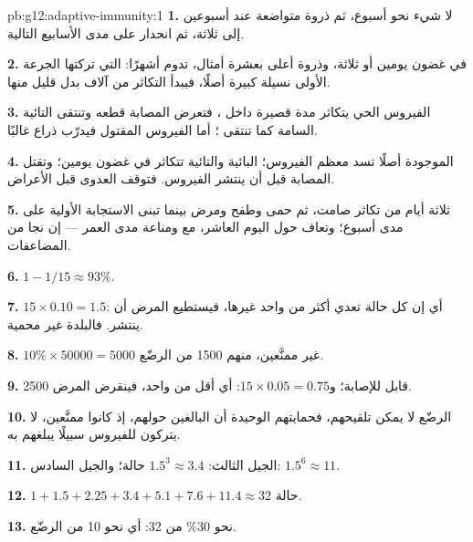 \begin{solution}{pb:g12:adaptive-immunity:1}
\textbf{1.} لا شيء نحو أسبوع، ثم ذروة متواضعة عند أسبوعين إلى ثلاثة،
ثم انحدار على مدى الأسابيع التالية.

\textbf{2.}  في غضون يومين أو ثلاثة، وذروة أعلى بعشرة
أمثال، تدوم أشهرًا:  التي تركتها الجرعة الأولى نسيلة
كبيرة أصلًا، فيبدأ التكاثر من آلاف  بدل قليل منها.

\textbf{3.} الفيروس الحي يتكاثر مدة قصيرة داخل ، فتعرض 
المصابة قطعه وتنتقى  التائية السامة كما تنتقى ؛
أما الفيروس المقتول فيدرّب ذراع  غالبًا.

\textbf{4.}  الموجودة أصلًا تسد معظم الفيروس؛  البائية والتائية تتكاثر في غضون يومين؛ وتقتل  المصابة
قبل أن ينتشر الفيروس. فتوقف العدوى قبل الأعراض.

\textbf{5.} ثلاثة أيام من تكاثر صامت، ثم حمى وطفح ومرض بينما تبنى
الاستجابة الأولية على مدى أسبوع؛ وتعاف حول اليوم العاشر، مع  ومناعة مدى العمر --- إن نجا من المضاعفات.

\textbf{6.} $1 - 1/15 \approx 93\%$.

\textbf{7.} $15 \times 0.10 = 1.5$: أي إن كل حالة تعدي أكثر من واحد
غيرها، فيستطيع المرض أن ينتشر. فالبلدة غير محمية.

\textbf{8.} $10\% \times \num{50000} = 5000$ غير ممنَّعين، منهم 1500
من الرضّع.

\textbf{9.} 2500 قابل للإصابة؛ و$15 \times 0.05 = 0.75$: أي أقل من
واحد، فينقرض المرض.

\textbf{10.} الرضّع لا يمكن تلقيحهم، فحمايتهم الوحيدة أن البالغين
حولهم، إذ كانوا ممنَّعين، لا يتركون للفيروس سبيلًا يبلغهم به.

\textbf{11.} الجيل الثالث: $1.5^3 \approx 3.4$ حالة؛ والجيل السادس:
$1.5^6 \approx 11$.

\textbf{12.} $1 + 1.5 + 2.25 + 3.4 + 5.1 + 7.6 + 11.4 \approx 32$ حالة.

\textbf{13.} نحو 30\% من 32: أي نحو 10 من الرضّع.


\end{solution}
